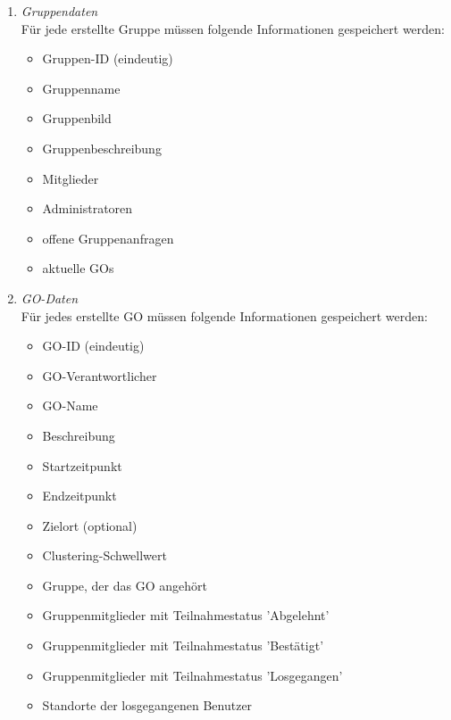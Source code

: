 \documentclass[parskip=full]{scrartcl}
\def\threedigits#1{%
  \ifnum#1<100 0\fi
  \ifnum#1<10 0\fi
  \number#1}
\begin{document}
\begin{enumerate}[label={\textbf{/D\protect\threedigits{\theenumi}0/}}, leftmargin=*]
	\item \textit{Gruppendaten} \\Für jede erstellte Gruppe müssen folgende Informationen gespeichert werden:
	\begin{itemize}
		\item Gruppen-ID (eindeutig)
		\item Gruppenname
		\item \colorbox{shadecolor}{Gruppenbild}
		\item \colorbox{shadecolor}{Gruppenbeschreibung}
		\item Mitglieder
		\item Administratoren
		\item offene Gruppenanfragen %
		\item aktuelle GOs
	\end{itemize}
	\item \textit{GO-Daten} \label{GO-Daten} \\
	Für jedes erstellte GO müssen folgende Informationen gespeichert werden:
	\begin{itemize}
		\item GO-ID (eindeutig)
		\item GO-Verantwortlicher
		\item GO-Name
		\item \colorbox{shadecolor}{Beschreibung}
		\item Startzeitpunkt
		\item Endzeitpunkt
		\item Zielort (optional)
		\item \colorbox{shadecolor}{Clustering-Schwellwert}
		\item Gruppe, der das GO angehört
		\item Gruppenmitglieder mit Teilnahmestatus 'Abgelehnt'
		\item Gruppenmitglieder mit Teilnahmestatus 'Bestätigt'
		\item Gruppenmitglieder mit Teilnahmestatus 'Losgegangen'
		\item Standorte der losgegangenen Benutzer
	\end{itemize}
\end{enumerate}

\newpage
\end{document}

